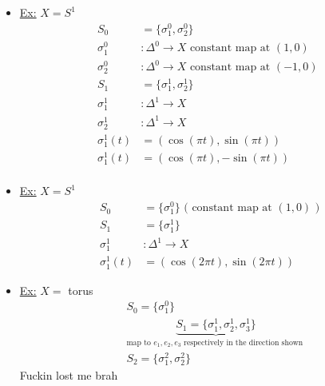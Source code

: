 \documentclass[../notes.tex]{subfiles}
\begin{document}
    \begin{itemize}
        \item \underline{Ex:} $X=S^1$
            \begin{align*}
                S_0 &= \{\sigma_1^0,\sigma_2^0\}\\
                \sigma_1^0&:\Delta^0\rightarrow X \text{ constant map at $(1,0)$ }\\
                \sigma_2^0&:\Delta^0\rightarrow X \text{ constant map at $(-1,0)$ }\\
                S_1 &= \{\sigma_1^1,\sigma_2^1\}\\
                \sigma_1^1&:\Delta^1\rightarrow X\\
                \sigma_2^1&:\Delta^1\rightarrow X\\
                \sigma_1^1(t)&=(\cos(\pi t),\sin(\pi t))\\
                \sigma_1^1(t)&=(\cos(\pi t),-\sin(\pi t))\\
            \end{align*}
        \begin{center}
        \end{center}
    \item \underline{Ex:} $X=S^1$
        \begin{align*}
            S_0 &= \{\sigma_1^0\} \text{ ( constant map at $(1,0)$ ) }\\
            S_1 &= \{\sigma_1^1\}\\
            \sigma_1^1&:\Delta^1 \rightarrow X\\
            \sigma_1^1(t)&=(\cos(2\pi t),\sin(2\pi t))
        \end{align*}
        \begin{center}
        \end{center}
    \item \underline{Ex:} $X=$ torus
        \begin{align*}
            &S_0 = \{\sigma_1^0\}\\
            &\underbrace{S_1 = \{\sigma_1^1,\sigma_2^1,\sigma_3^1\}}_{\text{
                map to $e_1,e_2,e_3$ respectively in the direction shown
                }
            }\\
            &S_2= \{\sigma_1^2,\sigma_2^2\}
        \end{align*}
        Fuckin lost me brah
    \end{itemize}
\end{document}
